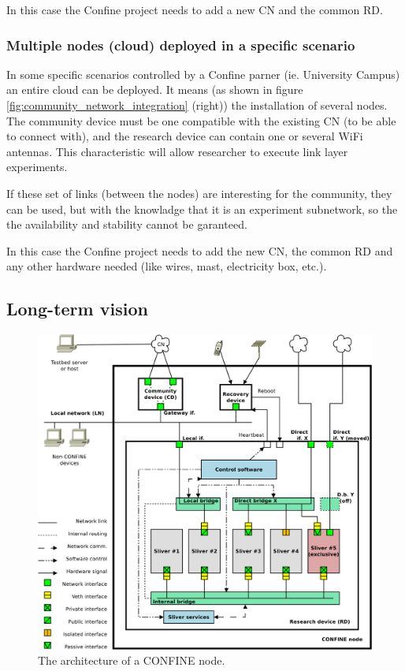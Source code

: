 \documentclass[conference]{IEEEtran}
\begin{document}
In this case the Confine project needs to add a new CN and the common RD.

\subsubsection{Multiple nodes (cloud) deployed in a specific scenario}
In some specific scenarios controlled by a Confine parner (ie. University Campus) an entire cloud can be 
deployed. It means (as shown in figure \ref{fig:community_network_integration} (right)) the installation of several 
nodes. The community device must be one compatible with the existing CN (to be able to connect with), and 
the research device can contain one or several WiFi antennas. This characteristic will allow researcher to 
execute link layer experiments.

If these set of links (between the nodes) are interesting for the community, they can be used, but
with the knowladge that it is an experiment subnetwork, so the the availability and stability cannot be garanteed.

In this case the Confine project needs to add the new CN, the common RD and any other hardware needed (like wires,
mast, electricity box, etc.).

\subsection{Long-term vision}

\begin{figure}[!t]
\centering
\includegraphics[width=\linewidth]{node-arch}
\caption{The architecture of a CONFINE node.}
\label{fig:node-arch}
\end{figure}
\end{document}
